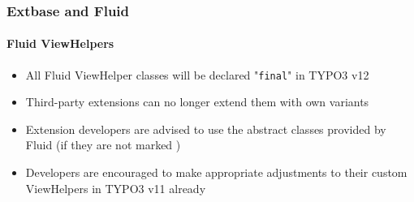 %

\begin{frame}[fragile]
	\frametitle{Extbase and Fluid}
	\framesubtitle{Fluid ViewHelpers}


	\begin{itemize}
		\item All Fluid ViewHelper classes will be declared "\texttt{final}" in
			TYPO3 v12
		\item Third-party extensions can no longer extend them with own variants
		\item Extension developers are advised to use the abstract classes
			provided by Fluid (if they are not marked \texttt{\@internal})
		\item Developers are encouraged to make appropriate adjustments to their
			custom ViewHelpers in TYPO3 v11 already
	\end{itemize}

\end{frame}

